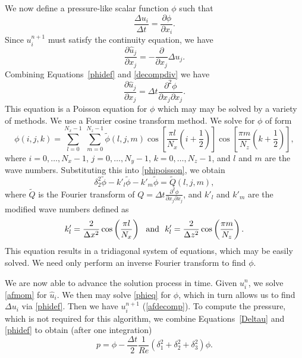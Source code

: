 \documentclass[10pt]{article}
\begin{document}
We now define a pressure-like scalar function $\phi$ such that 
\begin{equation}\label{phidef}
\frac{\Delta u_i}{\Delta t}=\frac{\partial \phi}{\partial x_i}.
\end{equation}
Since $u_i^{n+1}$ must satisfy the continuity equation, we have
\begin{equation}\label{decompdiv}
\frac{\partial \hat{u}_j}{\partial x_j}
=-\frac{\partial}{\partial x_j}\Delta u_j.
\end{equation}
Combining Equations~\ref{phidef} and \ref{decompdiv} we have
\begin{equation}\label{phipoisson}
\frac{\partial \hat{u}_j}{\partial x_j}=\Delta t\frac{\partial^2 \phi}{\partial x_j \partial x_j}.
\end{equation}
This equation is a Poisson equation for $\phi$ which may may be solved
by a variety of methods.  We use a Fourier cosine transform method.
We solve for $\phi$ of form
\begin{equation}
\phi(i,j,k)=\sum^{N_x-1}_{l=0}\ \sum^{N_z-1}_{m=0} \tilde{\phi}(l,j,m)
\cos \left[\frac{\pi l}{N_x}\left(i+\frac{1}{2}\right)\right]
\cos \left[\frac{\pi m}{N_z}\left(k+\frac{1}{2}\right)\right],
\end{equation}
where $i=0,\dots ,N_x-1$, $j=0,\dots ,N_y-1$, $k=0,\dots ,N_z-1$, and $l$
and $m$ are the wave numbers.  Substituting this into
\autoref{phipoisson}, we obtain
\begin{equation}\label{phieq}
\delta_2^2 \tilde{\phi} - k'_l\tilde{\phi} -
k'_m\tilde{\phi}=\tilde{Q}(l,j,m),
\end{equation}
where $\tilde{Q}$ is the Fourier transform of $Q=\Delta
t\frac{\partial^2 \phi}{\partial x_j \partial x_j}$, and $k'_l$ and
$k'_m$ are the modified wave numbers defined as
\begin{equation}
k'_l=\frac{2}{\Delta x^2}\cos \left(\frac{\pi l}{N_x}\right)
\hbox{\ \ and\ \ }
k'_l=\frac{2}{\Delta z^2}\cos \left(\frac{\pi m}{N_z}\right).
\end{equation}
This equation results in a tridiagonal system of equations, which may
be easily solved. We need only perform an inverse Fourier transform to
find $\phi$.  

We are now able to advance the solution process in time.
Given $u_i^n$, we solve \autoref{afmom} for $\hat{u}_i$.  We then
may solve \autoref{phieq} for $\phi$, which in turn allows us to
find $\Delta u_i$ via \autoref{phidef}.  Then we have $u_i^{n+1}$
(\autoref{afdecomp}).  To compute the pressure, which is not
required for this algorithm, we combine Equations~\ref{Deltau} and
\ref{phidef} to obtain (after one integration)
\begin{equation}
p=\phi-\frac{\Delta t}{2}\frac{1}{Re}
\left(\delta_1^2+\delta_2^2+\delta_3^2\right)\phi.
\end{equation}
\end{document}
